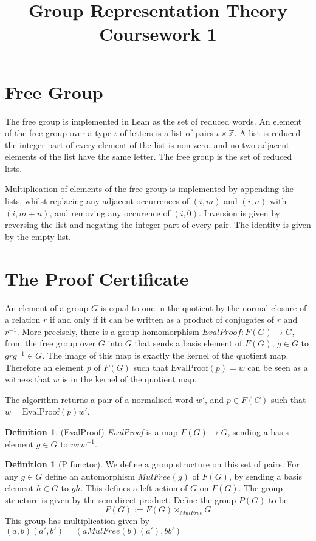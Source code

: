 \documentclass[11pt]{article} %
\title{Group Representation Theory Coursework 1}
\theoremstyle{definition}
\theoremstyle{definition}
\theoremstyle{definition}
\theoremstyle{definition}
\theoremstyle{definition}
\newtheorem{defn}[theorem]{Definition}
\theoremstyle{definition}
\begin{document}
\section{Free Group}

The free group is implemented in Lean as the set of reduced words. An element of
the free group over a type $\iota$ of letters is a list of pairs $\iota \times \mathbb{Z}$.
A list is reduced the integer part of every element of the list is non zero, and
no two adjacent elements of the list have the same letter. The free group is the set of
reduced lists.

Multiplication of elements of the free group is implemented by appending the lists,
whilst replacing any adjacent occurrences of $(i, m)$ and $(i, n)$ with $(i, m + n)$, and removing
any occurence of $(i,0)$. Inversion is given by reversing the list and negating
the integer part of every pair. The identity is given by the empty list.

\section{The Proof Certificate}

An element of a group $G$ is equal to one in the quotient by the normal closure
of a relation $r$ if and only if it can be written as a product of conjugates of $r$ and $r^{-1}$.
More precisely, there is a group homomorphism $\textit{EvalProof} : F(G) \to G$, from the free group
over $G$ into $G$ that sends a basis element of $F(G)$,
$g \in G$ to $grg^{-1} \in G$. The image of this map is exactly the kernel of the quotient map.
Therefore an element $p$ of $F(G)$ such that $\text{EvalProof}(p) = w$
can be seen as a witness that $w$ is in the kernel of the quotient map.

The algorithm returns a pair of a normalised word $w'$, and
$p \in F(G)$ such that \newline $w = \text{EvalProof}(p) w'$.

\begin{defn}(EvalProof)
  \textit{EvalProof} is a map $F(G)\to G$, sending a basis element $g \in G$ to $wrw^{-1}$.
\end{defn}

\begin{defn}[P functor]
  We define a group structure on this set of pairs.
  For any $g \in G$ define an automorphism $MulFree(g)$ of $F(G)$, by sending a basis
  element $h \in G$ to $gh$. This defines a left action of $G$ on $F(G)$. The group
  structure is given by the semidirect product. Define the group $P(G)$ to be
  \begin{equation}
  P(G) := F(G) \rtimes_{MulFree} G
  \end{equation}
  This group has multiplication given by $(a, b) (a', b') = (a MulFree(b)(a'), bb')$
\end{defn}
\end{document}

